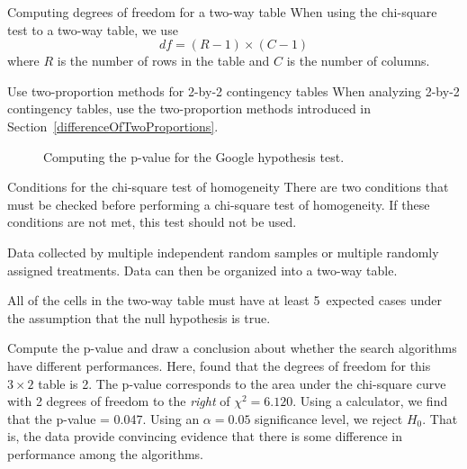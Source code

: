 \begin{onebox}{Computing degrees of freedom for a two-way table}
When using the chi-square test to a two-way table, we use
$$ df = (R-1)\times (C-1) $$
where $R$ is the number of rows in the table and $C$ is the number of columns.\end{onebox}

\begin{onebox}{Use two-proportion methods for 2-by-2 contingency tables}
When analyzing 2-by-2 contingency tables, use the two-proportion methods introduced in Section~\ref{differenceOfTwoProportions}.\end{onebox}

\begin{figure}[h]
\centering
{}
\caption{Computing the p-value for the Google hypothesis test.}
\label{googleHTForDiffAlgPerformancePValue}
\end{figure}

\D{\newpage}

\begin{onebox}{Conditions for the chi-square test of homogeneity}
There are two conditions that must be checked before performing a chi-square test of homogeneity. If these conditions are not met, this test should not be used.\vspace{-1mm}
\begin{description}
\setlength{\itemsep}{0mm}
\item[Multiple random samples or randomly assigned treatments. ]Data collected by multiple independent random samples or multiple randomly assigned treatments. Data can then be organized into a two-way table.
\item[All expected counts at least 5. ] All of the cells in the two-way table must  have at least 5~expected cases under the assumption that the null hypothesis is true.
\end{description}\end{onebox}

\begin{examplewrap}
\begin{nexample}{Compute the p-value and draw a conclusion about whether the search algorithms have different performances.}
Here, found that the degrees of freedom for this $3\times 2$ table is 2.  The p-value corresponds to the area under the chi-square curve with 2 degrees of freedom to the \emph{right} of $\chi^2=6.120$.  Using a calculator, we find that the p-value = 0.047.  Using an $\alpha=0.05$ significance level, we reject $H_0$.  That is, the data provide convincing evidence that there is some difference in performance among the algorithms.
\end{nexample}
\end{examplewrap}

